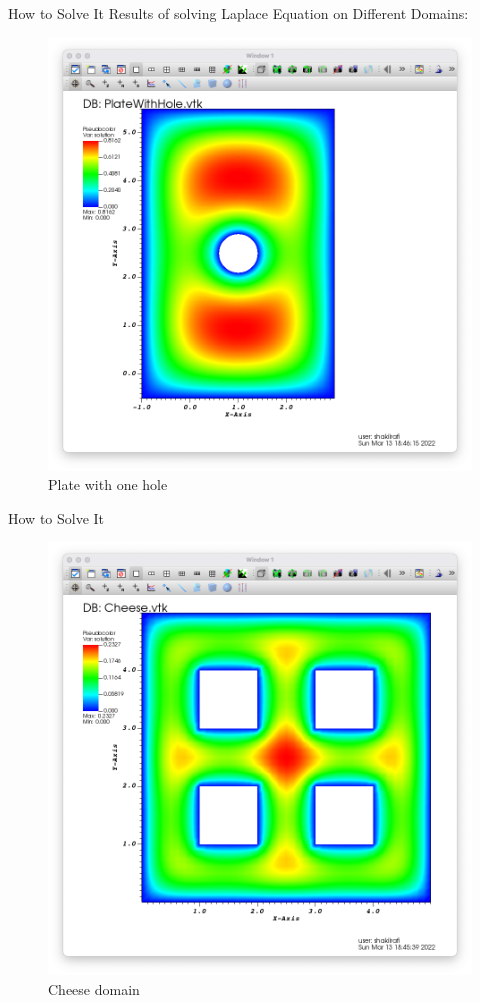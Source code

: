 \documentclass{beamer}
\begin{document}
\begin{frame}{How to Solve It}
    Results of solving Laplace Equation on Different Domains:
    \begin{figure}
        \includegraphics[scale = 0.2]{PlateWithHole.png}
        \caption{Plate with one hole}
    \end{figure} \quad
\end{frame}
\begin{frame}{How to Solve It}
    \begin{figure}
        \includegraphics[scale = 0.2]{Cheese.png}
        \caption{Cheese domain}
    \end{figure}
\end{frame}
\end{document}
